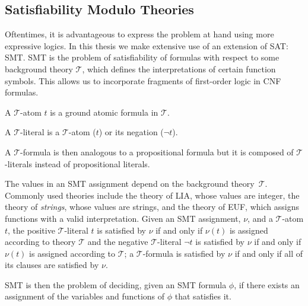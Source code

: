\subsection{Satisfiability Modulo Theories}

Oftentimes, it is advantageous to express the problem at hand using more expressive logics.
In this thesis we make extensive use of an extension of \ac{SAT}: \acf{SMT}.
\ac{SMT} is the problem of satisfiability of formulas with respect to some background theory \(\mathcal{T}\), which defines the interpretations of certain function symbols. This allows us to incorporate fragments of first-order logic in \ac{CNF} formulas.

\begin{definition}
A \(\mathcal{T}\)-atom \(t\) is a ground atomic formula in \(\mathcal{T}\).
\end{definition}


\begin{definition}
A \(\mathcal{T}\)-literal is a \(\mathcal{T}\)-atom (\(t\)) or its negation (\(\neg t\)).
\end{definition}

\begin{definition}
A \(\mathcal{T}\)-formula is then analogous to a propositional formula but it is composed of \(\mathcal{T}\)-literals instead of propositional literals.
\end{definition}

\noindent
The values in an \ac{SMT} assignment depend on the background theory~\(\mathcal{T}\). Commonly used theories include the theory of \ac{LIA}, whose values are integer, the theory of \textit{strings}, whose values are strings, and the theory of \ac{EUF}, which assigns functions with a valid interpretation. Given an \ac{SMT} assignment, \(\nu\), and a \(\mathcal{T}\)-atom \(t\), the positive \(\mathcal{T}\)-literal \(t\) is satisfied by \(\nu\) if and only if \(\nu(t)\) is assigned \true according to theory \(\mathcal{T}\) and the negative \(\mathcal{T}\)-literal \(\neg t\) is satisfied by \(\nu\) if and only if \(\nu(t)\) is assigned \false according to \(\mathcal{T}\); a \(\mathcal{T}\)-formula is satisfied by \(\nu\) if and only if all of its clauses are satisfied by \(\nu\).

\ac{SMT} is then the problem of deciding, given an SMT formula \(\phi\), if there exists an assignment of the variables and functions of \(\phi\) that satisfies it.

